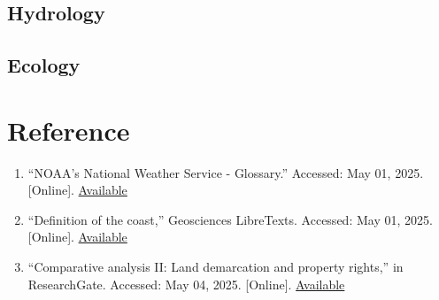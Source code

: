 \documentclass{article}
\begin{document}
{%

\subsection{Hydrology}



\subsection{Ecology}




\newpage
{}
\fancyfoot[C]{\thepage} 
\thispagestyle{fancy}
\section{Reference}

\begin{enumerate}

    \item {“NOAA’s National Weather Service - Glossary.” Accessed: May 01, 2025. [Online]. \href{https://forecast.weather.gov/glossary.php?word=coastal%20waters}{Available}}
    
    \item {“Definition of the coast,” Geosciences LibreTexts. Accessed: May 01, 2025. [Online]. \href{https://geo.libretexts.org/Bookshelves/Oceanography/Coastal_Dynamics_(Bosboom_and_Stive)/01%3A_Overview/1.05%3A_Coastal_(morpho)_dynamics/1.5.01%3A_Definition_of_the_coast}{Available}}
    
    \item {“Comparative analysis II: Land demarcation and property rights,” in ResearchGate. Accessed: May 04, 2025. [Online]. \href{https://www.researchgate.net/publication/362949604_Comparative_analysis_II_Land_demarcation_and_property_rights}{Available}}
    

\end{enumerate}}
\end{document}
